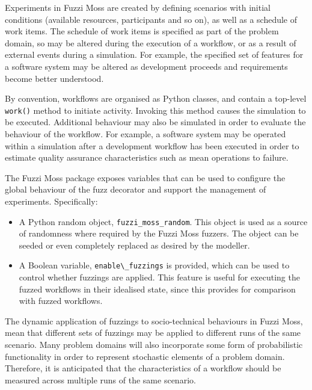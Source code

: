 \documentclass{sig-alternate}
\begin{document}
Experiments in Fuzzi Moss are created by defining scenarios with initial
conditions (available resources, participants and so on), as well as a schedule
of work items.  The schedule of work items is specified as part of the problem
domain, so may be altered during the execution of a workflow, or as a result of
external events during a simulation.  For example, the specified set of features
for a software system may be altered as development proceeds and requirements
become better understood.

By convention, workflows are organised as Python classes, and contain a
top-level \lstinline!work()! method to initiate activity.  Invoking this method
causes the simulation to be executed.  Additional behaviour may also be
simulated in order to evaluate the behaviour of the workflow.  For example, a
software system may be operated within a simulation after a development workflow
has been executed in order to estimate quality assurance characteristics such as
mean operations to failure.

The Fuzzi Moss package exposes variables that can be used to configure the
global behaviour of the fuzz decorator and support the management of
experiments. Specifically:

\begin{itemize}
\item A Python random object, \lstinline!fuzzi_moss_random!.  This object is
  used as a source of randomness where required by the Fuzzi Moss fuzzers.  The
  object can be seeded or even completely replaced as desired by the modeller.

\item A Boolean variable, \lstinline!enable\_fuzzings! is provided, which can be
  used to control whether fuzzings are applied.  This feature is useful for
  executing the fuzzed workflows in their idealised state, since this provides
  for comparison with fuzzed workflows.

\end{itemize}

The dynamic application of fuzzings to socio-technical behaviours in Fuzzi Moss,
mean that different sets of fuzzings may be applied to different runs of the
same scenario.  Many problem domains will also incorporate some form of
probabilistic functionality in order to represent stochastic elements of a
problem domain.  Therefore, it is anticipated that the characteristics of a
workflow should be measured across multiple runs of the same scenario.
\end{document}
